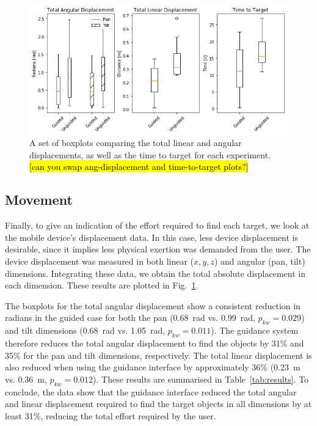 \documentclass[runningheads]{llncs}
\DeclareRobustCommand{\tofix}[1]{{\sethlcolor{yellow}\hl{[#1]}}}
\begin{document}
\begin{figure}[t]
  \centering
  \includegraphics[width=1.0\textwidth]{figures/boxplot_combined.png}
  \caption{A set of boxplots comparing the total linear and angular displacements, as well as the time to target for each experiment. \tofix{can you swap ang-displacement and time-to-target plots?} }\label{fig:boxplots}
\end{figure}

\subsection{Movement}

Finally, to give an indication of the effort required to find each target, we look at the mobile device's displacement data. 
In this case, less device displacement is desirable, since it implies less physical exertion was demanded from the user.
%
The device displacement was measured in both linear ($x, y, z$) and angular (pan, tilt) dimensions.
Integrating these data, we obtain the total absolute displacement in each dimension.
These results are plotted in Fig.~\ref{fig:boxplots}.


The boxplots for the total angular displacement show a consistent reduction in radians in the guided case for both the pan (\SI{0.68}{\radian} vs. \SI{0.99}{\radian}, $p_{kw}=0.029$) and tilt dimensions (\SI{0.68}{\radian} vs. \SI{1.05}{\radian}, $p_{kw}=0.011$). 
The guidance system therefore reduces the total angular displacement to find the objects by 31\% and 35\% for the pan and tilt dimensions, respectively. 
The total linear displacement is also reduced when using the guidance interface by approximately 36\% (\SI{0.23}{\metre} vs. \SI{0.36}{\metre}, $p_{kw}=0.012$).
These results are summarised in Table~\ref{tab:results}.
To conclude, the data show that the guidance interface reduced the total angular and linear displacement required to find the target objects in all dimensions by at least 31\%, reducing the total effort required by the user. 
\end{document}
